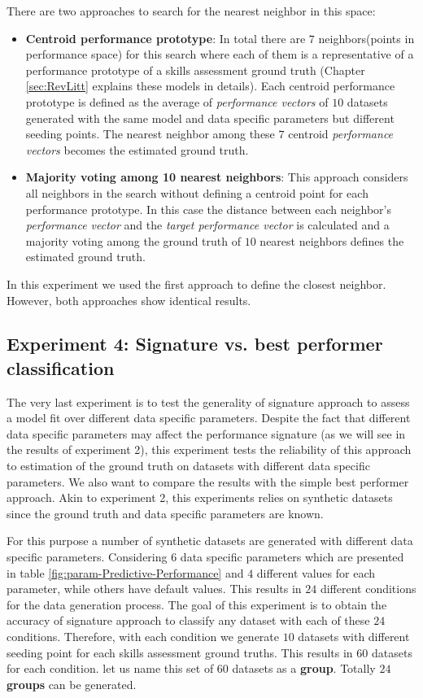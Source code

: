 There are two approaches to search for the nearest neighbor in this space:
\begin{itemize}
\item \textbf{Centroid performance prototype}: In total there are $7$ neighbors(points in performance space) for this search where each of them is a representative of a performance prototype of a skills assessment ground truth (Chapter \ref{sec:RevLitt} explains these models in details). Each centroid performance prototype is defined as the average of \textit{performance vectors} of $10$ datasets generated with the same model and data specific parameters but different seeding points. The nearest neighbor among these $7$ centroid \textit{performance vectors} becomes the estimated ground truth.
\item \textbf{Majority voting among 10 nearest neighbors}: This approach considers all neighbors in the search without defining a centroid point for each performance prototype. In this case the distance between each neighbor's \textit{performance vector} and the \textit{target performance vector} is calculated and a majority voting among the ground truth of $10$ nearest neighbors defines the estimated ground truth.
\end{itemize}

In this experiment we used the first approach to define the closest neighbor. However, both approaches show identical results.

\subsection{Experiment 4: Signature vs. best performer classification}
\label{Classification}

The very last experiment is to test the generality of signature approach to assess a model fit over different data specific parameters. Despite the fact that different data specific parameters may affect the performance signature (as we will see in the results of experiment 2), this experiment tests the reliability of this approach to estimation of the ground truth on datasets with different data specific parameters. We also want to compare the results with the simple best performer approach. Akin to experiment 2, this experiments relies on synthetic datasets since the ground truth and data specific parameters are known. 

For this purpose a number of synthetic datasets are generated with different data specific parameters. Considering $6$ data specific parameters which are presented in table \ref{fig:param-Predictive-Performance} and $4$ different values for each parameter, while others have default values. This results in $24$ different conditions for the data generation process. The goal of this experiment is to obtain the accuracy of signature approach to classify any dataset with each of these $24$ conditions. Therefore, with each condition we generate $10$ datasets with different seeding point for each skills assessment ground truths. This results in $60$ datasets for each condition. let us name this set of $60$ datasets as a \textbf{group}. Totally $24$ \textbf{groups} can be generated.

